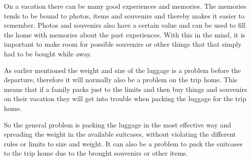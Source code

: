 On a vacation there can be many good experiences and memories. The memories tends to be bound to photos, items and souvenirs and thereby makes it easier to remember. Photos and souvenirs also have a certain value and can be used to fill the home with memories about the past experiences.
With this in the mind, it is important to make room for possible souvenirs or other things that that simply had to be bought while away.

As earlier mentioned the weight and size of the luggage is a problem before the departure, therefore it will normally also be a problem on the trip home.
This means that if a family packs just to the limits and then buy things and souvenirs on their vacation they will get into trouble when packing the luggage for the trip home.

So the general problem is packing the luggage in the most effective way and spreading the weight in the available suitcases, without violating the different rules or limits to size and weight. It can also be a problem to pack the suitcases to the trip home due to the brought souvenirs or other items.